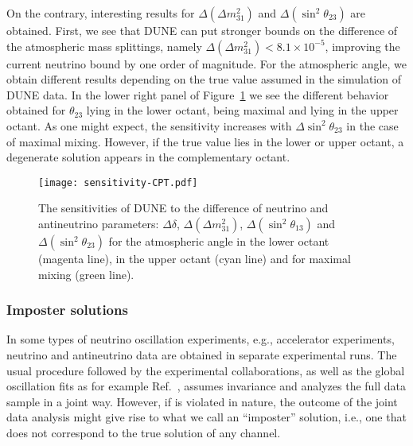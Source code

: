 On the contrary, interesting results for $\Delta(\Delta m_{31}^2)$ and $\Delta(\sin^2\theta_{23})$ are obtained. First, we see that  DUNE can put stronger bounds on the difference of the atmospheric mass splittings, namely $\Delta(\Delta m_{31}^2) < 8.1\times 10^{-5}$, improving the current neutrino bound by one order of magnitude. For the atmospheric angle, we obtain different results depending on the true value assumed in the simulation of DUNE data. In the lower right panel of Figure~\ref{fig:sensitivity-CPT} we see the different behavior obtained for $\theta_{23}$ lying in the lower octant, being maximal and lying in the upper octant. 
 As one might expect, the sensitivity increases with $\Delta\sin^2\theta_{23}$ in the case of maximal mixing. However, if the true value lies in the lower or upper octant, a degenerate solution appears in the complementary octant.
\begin{figure}[!htb]
 \centering
        \texttt{[image: sensitivity-CPT.pdf]}
        \caption[Sensitivities to the difference of neutrino and antineutrino parameters]{The sensitivities of DUNE to the difference of neutrino and antineutrino parameters: 
        $\Delta\delta$, $\Delta(\Delta m_{31}^2)$, $\Delta(\sin^2\theta_{13})$ and $\Delta(\sin^2\theta_{23})$  
        for the atmospheric angle in the lower octant (magenta line),  in the upper octant (cyan line) and for maximal mixing (green line).}
	\label{fig:sensitivity-CPT}
\end{figure}

\subsubsection{Imposter solutions}
\label{sec:impost}
In %
some types of neutrino oscillation experiments, e.g., accelerator experiments, neutrino and antineutrino data are obtained in separate experimental runs. The usual procedure followed by the experimental collaborations, as well as the global oscillation fits as for example Ref.~\cite{deSalas:2017kay}, assumes  invariance and analyzes the full data sample in a joint way.
However, if  is violated in nature, the outcome of the joint data analysis might give rise to what we call an ``imposter'' solution, i.e., %
one that does not correspond to the true solution of any channel. 


